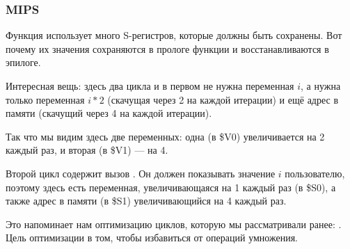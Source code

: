 ﻿\subsubsection{MIPS}
Функция использует много S-регистров, которые должны быть сохранены. Вот почему их значения сохраняются
в прологе функции и восстанавливаются в эпилоге.



Интересная вещь: здесь два цикла и в первом не нужна переменная $i$, а нужна только переменная
$i*2$ (скачущая через 2 на каждой итерации) и ещё адрес в памяти (скачущий через 4 на каждой итерации).

Так что мы видим здесь две переменных: одна (в \$V0) увеличивается на 2 каждый раз, и вторая (в \$V1) --- на 4.

Второй цикл содержит вызов \printf. Он должен показывать значение $i$ пользователю,
поэтому здесь есть переменная, увеличивающаяся на 1 каждый раз (в \$S0), а также адрес в памяти (в \$S1) 
увеличивающийся на 4 каждый раз.

Это напоминает нам оптимизацию циклов, которую мы рассматривали ранее: .
Цель оптимизации в том, чтобы избавиться от операций умножения.

